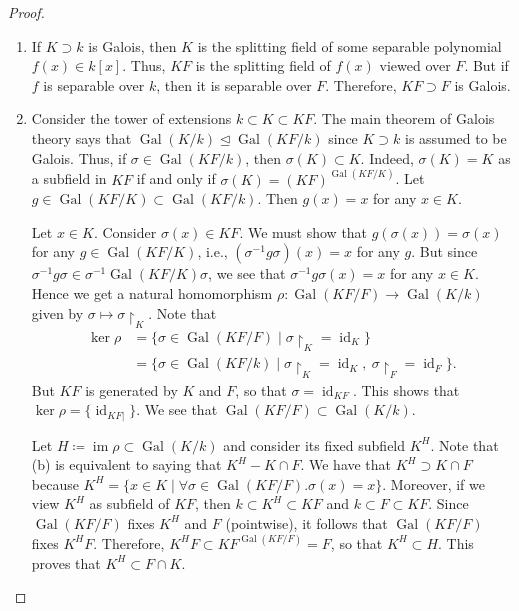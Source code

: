 \documentclass[10pt,letterpaper,cm]{nupset}
\theoremstyle{definition}
\theoremstyle{theorem}
\theoremstyle{remark}
\newcommand{\1}{\mathbf{1}}
\newcommand{\0}{\vec 0}
\DeclareMathOperator{\id}{id}
\DeclareMathOperator{\gal}{Gal}
\DeclareMathOperator{\im}{im}
\begin{document}
\begin{proof} $ $
\begin{enumerate}[label=(\alph*)]
\item  If $K\supset k$ is Galois, then $K$ is the splitting field of some separable polynomial $f(x) \in k[x]$. Thus, $KF$ is the splitting field of $f(x)$ viewed over $F$. But if $f$ is separable over $k$, then it is separable over $F$. Therefore, $KF \supset F$ is Galois.
\item Consider the tower of extensions $k \subset K \subset KF$. The main theorem of Galois theory says that $\gal(K/k) \unlhd \gal(KF/k)$ since $K\supset k$ is assumed to be Galois. Thus, if $\sigma \in \gal(KF/k)$, then $\sigma(K) \subset K$. Indeed, $\sigma(K) = K$ as a subfield in $KF$ if and only if $\sigma(K) = (KF)^{\gal(KF/K)}$. Let $g\in \gal(KF/K) \subset \gal(KF/k)$. Then $g(x) = x$ for any $x\in K$. 

Let $x\in K$. Consider $\sigma(x) \in KF$.  We must show that $g(\sigma(x)) = \sigma(x)$ for any $g \in \gal(KF/K)$, i.e., $(\sigma^{-1}{g}{\sigma})(x) = x$ for any $g$. But since $\sigma^{-1}{g}{\sigma} \in \sigma^{-1}{\gal(KF/K)}{\sigma}$, we see that $\sigma^{-1}{g}{\sigma}(x) = x$ for any $x\in K$. Hence we get a natural homomorphism $ \rho : \gal(KF/F) \to \gal(K/k)$ given by $\sigma \mapsto \sigma \restriction_K$.  Note that \begin{align*} \ker{\rho} & = \{\sigma \in \gal(KF/F) \mid \sigma \restriction_K = \id_K\}
\\ & = \{\sigma \in \gal(KF/k) \mid \sigma \restriction_K = \id_K, \ \sigma \restriction_F = \id_F\}.
\end{align*}  But $KF$ is generated by $K$ and $F$, so that $\sigma = \id_{KF}$. This shows that $\ker{\rho} = \{\id_{KF|}\}$. We see that $\gal(KF/F) \subset \gal(K/k)$. 

Let $H \coloneqq  \im{\rho} \subset \gal(K/k)$ and consider its fixed subfield $K^H$. Note that (b) is equivalent to saying that $K^H - K \cap F$. We have that $K^H \supset K \cap F$ because $K^H = \{x\in K \mid \forall \sigma \in \gal(KF/F).\sigma(x) =x\}$. Moreover, if we view $K^H$ as subfield of $KF$, then $k \subset K^H \subset KF$ and $k \subset F \subset KF$.  Since $\gal(KF/F)$ fixes $K^H$ and $F$ (pointwise), it follows that $\gal(KF/F)$ fixes $K^HF$. Therefore, $K^HF \subset KF^{\gal(KF/F)} = F$, so that $K^H \subset H$. This proves that $K^H \subset F \cap K$. 
\end{enumerate}
\end{proof}
\end{document}
